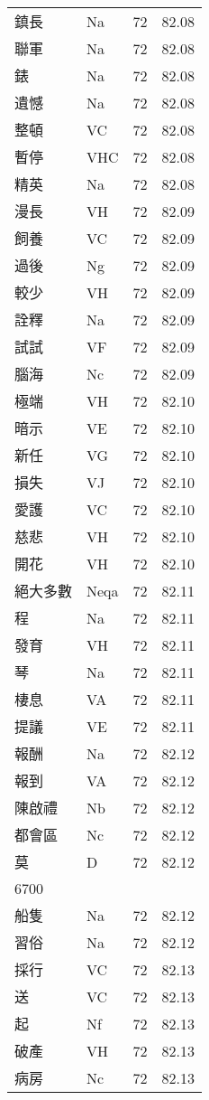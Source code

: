\documentclass[twocolumn]{book}
\begin{document}
\begin{supertabular}{llrr}
鎮長 & Na & 72 &  82.08\\
聯軍 & Na & 72 &  82.08\\
錶 & Na & 72 &  82.08\\
遺憾 & Na & 72 &  82.08\\
整頓 & VC & 72 &  82.08\\
暫停 & VHC & 72 &  82.08\\
精英 & Na & 72 &  82.08\\
漫長 & VH & 72 &  82.09\\
飼養 & VC & 72 &  82.09\\
過後 & Ng & 72 &  82.09\\
較少 & VH & 72 &  82.09\\
詮釋 & Na & 72 &  82.09\\
試試 & VF & 72 &  82.09\\
腦海 & Nc & 72 &  82.09\\
極端 & VH & 72 &  82.10\\
暗示 & VE & 72 &  82.10\\
新任 & VG & 72 &  82.10\\
損失 & VJ & 72 &  82.10\\
愛護 & VC & 72 &  82.10\\
慈悲 & VH & 72 &  82.10\\
開花 & VH & 72 &  82.10\\
絕大多數 & Neqa & 72 &  82.11\\
程 & Na & 72 &  82.11\\
發育 & VH & 72 &  82.11\\
琴 & Na & 72 &  82.11\\
棲息 & VA & 72 &  82.11\\
提議 & VE & 72 &  82.11\\
報酬 & Na & 72 &  82.12\\
報到 & VA & 72 &  82.12\\
陳啟禮 & Nb & 72 &  82.12\\
都會區 & Nc & 72 &  82.12\\
莫 & D & 72 &  82.12\\
6700\\
船隻 & Na & 72 &  82.12\\
習俗 & Na & 72 &  82.12\\
採行 & VC & 72 &  82.13\\
送 & VC & 72 &  82.13\\
起 & Nf & 72 &  82.13\\
破產 & VH & 72 &  82.13\\
病房 & Nc & 72 &  82.13\\

\end{supertabular}
\end{document}
